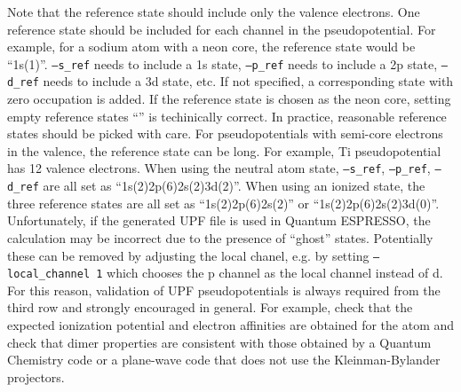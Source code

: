     Note that the reference state should include only the valence electrons.
    One reference state should be included for each channel in the pseudopotential.
    For example, for a sodium atom with a neon core, the reference state would be ``1s(1)''.
    \texttt{--s\_ref} needs to include a 1s state, \texttt{--p\_ref} needs to include a 2p state,
    \texttt{--d\_ref} needs to include a 3d state, etc. If not specified, a corresponding state with zero occupation is added.
    If the reference state is chosen as the neon core, setting empty reference states ``'' is techinically correct.
    In practice, reasonable reference states should be picked with care.
    For pseudopotentials with semi-core electrons in the valence, the reference state can be long.
    For example, Ti pseudopotential has 12 valence electrons. When using the neutral atom state,
    \texttt{--s\_ref}, \texttt{--p\_ref}, \texttt{--d\_ref} are all set as ``1s(2)2p(6)2s(2)3d(2)''.
    When using an ionized state, the three reference states are all set as ``1s(2)2p(6)2s(2)'' or ``1s(2)2p(6)2s(2)3d(0)''.
    Unfortunately, if the generated UPF file is used in Quantum ESPRESSO, the calculation may be incorrect due to the presence of ``ghost'' states. Potentially these can be removed by adjusting the local chanel, e.g. by setting \texttt{--local\_channel 1} which chooses the p channel as the local channel instead of d.
    For this reason, validation of UPF pseudopotentials is always required from the third row and strongly encouraged in general. For example, check that the expected ionization potential and electron affinities are obtained for the atom and check that dimer properties are consistent with those obtained by a Quantum Chemistry code or a plane-wave code that does not use the Kleinman-Bylander projectors.

    

